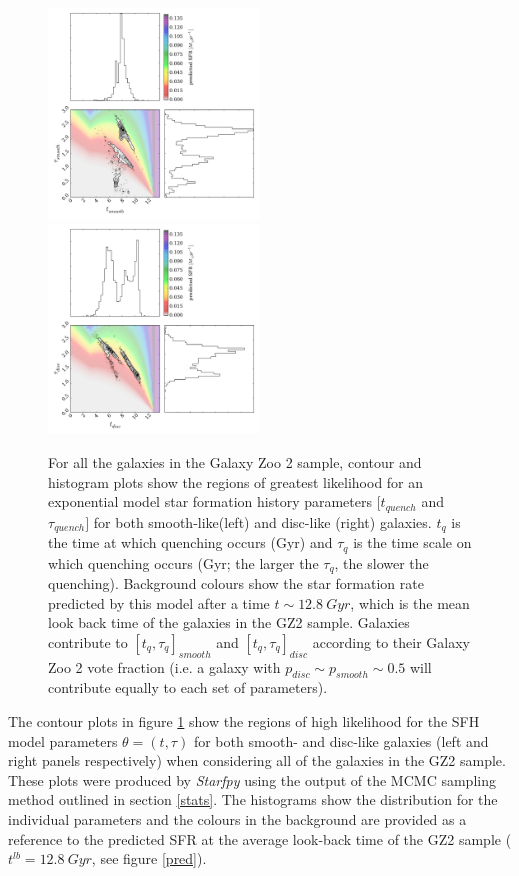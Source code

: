 \documentclass{mn2e}
\begin{document}
\begin{figure}
\includegraphics[width=0.4975\textwidth]{all_smooth.pdf}
\includegraphics[width=0.4975\textwidth]{all_disc.pdf}
\caption[8pt]{For all the galaxies in the Galaxy Zoo 2 sample, contour and histogram plots show the regions of greatest likelihood for an exponential model star formation history parameters $[t_{quench}$ and $\tau_{quench}]$ for both smooth-like(left) and disc-like (right) galaxies. $t_{q}$ is the time at which quenching occurs (Gyr) and $\tau_{q}$ is the time scale on which quenching occurs (Gyr; the larger the $\tau_{q}$, the slower the quenching). Background colours show the star formation rate predicted by this model after a time $t \sim 12.8~Gyr$, which is the mean look back time of the galaxies in the GZ2 sample. Galaxies contribute  to $[t_{q}, \tau_{q}]_{smooth}$ and $[t_{q}, \tau_{q}]_{disc}$ according to their Galaxy Zoo 2 vote fraction (i.e. a galaxy with $p_{disc} \sim p_{smooth} \sim 0.5$ will contribute equally to each set of parameters).}
\label{all}
\end{figure}


The contour plots in figure \ref{all} show the regions of high likelihood for the SFH model parameters $\theta = (t, \tau)$ for both smooth- and disc-like galaxies (left and right panels respectively) when considering all of the galaxies in the GZ2 sample. These plots were produced by \emph{Starfpy} using the output of the MCMC sampling method outlined in section \ref{stats}. The histograms show the distribution for the individual parameters and the colours in the background are provided as a reference to the predicted SFR at the average look-back time of the GZ2 sample ($t^{lb}=12.8~Gyr$, see figure \ref{pred}). 
\end{document}
